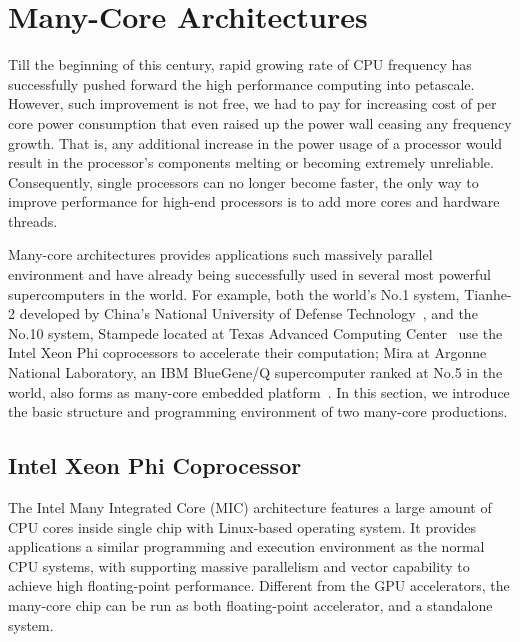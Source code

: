 \section{Many-Core Architectures}\label{sec:back-manycore}
Till the beginning of this century, rapid growing rate of CPU frequency
has successfully pushed forward the high performance computing into
petascale. However, such improvement is not free, we had to pay for
increasing cost of per core power consumption that even raised up the
power wall ceasing any frequency growth. That is, any additional increase
in the power usage of a processor would result in the processor's components
melting or becoming extremely unreliable. Consequently, single processors
can no longer become faster, the only way to improve performance for
high-end processors is to add more cores and hardware threads.

Many-core architectures provides applications such massively parallel
environment and have already being successfully used in several most
powerful supercomputers in the world. For example, both the world's No.1 system,
Tianhe-2 developed by China's National University of Defense
Technology~\cite{tianhe2}, and the No.10 system, Stampede located at Texas
Advanced Computing Center~\cite{stampede} use the Intel Xeon Phi coprocessors
to accelerate their computation; Mira at Argonne National Laboratory, an IBM
BlueGene/Q supercomputer ranked at No.5 in the world, also forms as
many-core embedded platform~\cite{mira}.
In this section, we introduce the basic structure and programming
environment of two many-core productions.

\subsection{Intel Xeon Phi Coprocessor}

The Intel Many Integrated Core (MIC) architecture features a large amount
of CPU cores inside single chip with Linux-based operating system. It
provides applications a similar programming and execution environment
as the normal CPU systems, with supporting massive parallelism and vector
capability to achieve high floating-point performance. Different from
the GPU accelerators, the many-core chip can be run as both floating-point
accelerator, and a standalone system.

